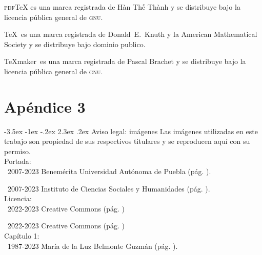 \documentclass[14pt,twoside,final]{extbook} %
\makeatletter
\renewcommand\section{\@startsection {section}{1}{\z@}%
                                     {-3.5ex \@plus -1ex \@minus -.2ex}%
                                     {2.3ex \@plus .2ex}%
                                     {\normalfont\large\bfseries\sc}}
\makeatother
\begin{document}
\textsc{pdf}\TeX{} es una marca registrada de Hàn Th\'{ê} Thành y se distribuye bajo la licencia pública general de \textsc{gnu}.

\TeX\texttrademark\ es una marca registrada de Donald~E.~Knuth y la American Mathematical Society y se distribuye bajo dominio publico.

\TeX{}maker\texttrademark\ es una marca registrada de Pascal Brachet y se distribuye bajo la licencia pública general de \textsc{gnu}.
\chapter{Apéndice 3}\label{ap:apendice-tres}
\thispagestyle{empty}
\pagestyle{fancy}
\fancyhf{} %
\fancyhead[RO,LE]{\thepage}
\renewcommand{\headrulewidth}{0pt}
\setcounter{page}{141}
\section{Aviso legal: imágenes}\label{sec:aviso-legal-imágenes}
Las imágenes utilizadas en este trabajo son propiedad de sus respectivos titulares y se reproducen aquí con su permiso. \\

\noindent Portada: \\

\noindent\textcopyright\ 2007-2023 Benemérita Universidad Autónoma de Puebla (pág. \pageref{fig:buap}).

\noindent\textcopyright\ 2007-2023 Instituto de Ciencias Sociales y Humanidades (pág. \pageref{fig:icsyh}). \\

\noindent Licencia: \\

\noindent\textcopyright\ 2022-2023 Creative Commons (pág. \pageref{fig:cc-large})

\noindent\textcopyright\ 2022-2023 Creative Commons (pág. \pageref{fig:cc-large}) \\

\noindent Capítulo 1: \\

\noindent\textcopyright\ 1987-2023 María de la Luz Belmonte Guzmán (pág. \pageref{fig:veracruz-1857}).
\end{document}

